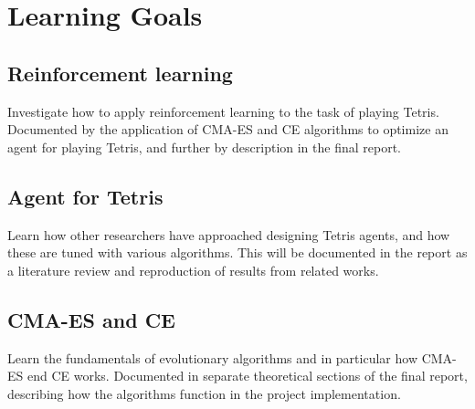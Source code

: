\section*{Learning Goals}
\subsection*{Reinforcement learning}
Investigate how to apply reinforcement learning to the task of playing Tetris. Documented by the application of CMA-ES and CE algorithms to optimize an agent for playing Tetris, and further by description in the final report.

\subsection*{Agent for Tetris}
Learn how other researchers have approached designing Tetris agents, and
how these are tuned with various algorithms. This will be documented in the 
report as a literature review and reproduction of results from related works.

\subsection*{CMA-ES and CE}
Learn the fundamentals of evolutionary algorithms
and in particular how CMA-ES end CE works. 
Documented in separate theoretical sections of the final report, 
describing how the algorithms
function in the project implementation.